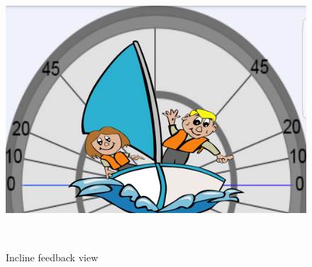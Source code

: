 \begin{figure}[H] 
 	\centering
	\begin{minipage}[c]{0.6\textwidth}
	\includegraphics[width=\textwidth]{Figures/incline.png}
	\caption{Incline feedback view}
	\label{feedback-incline}
	\end{minipage}
	~
	\begin{minipage}[c]{.3\textwidth}

\end{minipage}
\end{figure}
